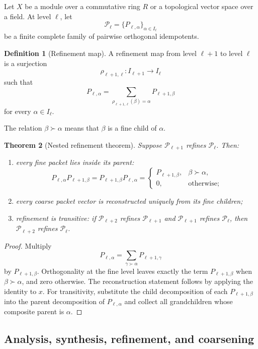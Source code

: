\documentclass[11pt]{article}
\newtheorem{theorem}{Theorem}[section]
\theoremstyle{definition}
\newtheorem{definition}[theorem]{Definition}
\theoremstyle{remark}
\newcommand{\cP}{\mathcal P}
\begin{document}
Let $X$ be a module over a commutative ring $R$ or a topological vector space over a field. At level $\ell$, let
\[
\cP_\ell=\{P_{\ell,\alpha}\}_{\alpha\in I_\ell}
\]
be a finite complete family of pairwise orthogonal idempotents.

\begin{definition}[Refinement map]\label{def:refinement-map}
A refinement map from level $\ell+1$ to level $\ell$ is a surjection
\[
\rho_{\ell+1,\ell}:I_{\ell+1}\longrightarrow I_\ell
\]
such that
\[
\boxed{
P_{\ell,\alpha}
=
\sum_{\rho_{\ell+1,\ell}(\beta)=\alpha}
P_{\ell+1,\beta}
}
\]
for every $\alpha\in I_\ell$.
\end{definition}

The relation $\beta\succ\alpha$ means that $\beta$ is a fine child of $\alpha$.

\begin{theorem}[Nested refinement theorem]\label{thm:nested-refinement}
Suppose $\cP_{\ell+1}$ refines $\cP_\ell$. Then:
\begin{enumerate}[label=(\alph*)]
\item every fine packet lies inside its parent:
\[
P_{\ell,\alpha}P_{\ell+1,\beta}
=
P_{\ell+1,\beta}P_{\ell,\alpha}
=
\begin{cases}
P_{\ell+1,\beta},&\beta\succ\alpha,\\
0,&\text{otherwise};
\end{cases}
\]
\item every coarse packet vector is reconstructed uniquely from its fine children;
\item refinement is transitive: if $\cP_{\ell+2}$ refines $\cP_{\ell+1}$ and $\cP_{\ell+1}$ refines $\cP_\ell$, then $\cP_{\ell+2}$ refines $\cP_\ell$.
\end{enumerate}
\end{theorem}

\begin{proof}
Multiply
\[
P_{\ell,\alpha}
=
\sum_{\gamma\succ\alpha}P_{\ell+1,\gamma}
\]
by $P_{\ell+1,\beta}$. Orthogonality at the fine level leaves exactly the term $P_{\ell+1,\beta}$ when $\beta\succ\alpha$, and zero otherwise. The reconstruction statement follows by applying the identity to $x$. For transitivity, substitute the child decomposition of each $P_{\ell+1,\beta}$ into the parent decomposition of $P_{\ell,\alpha}$ and collect all grandchildren whose composite parent is $\alpha$.
\end{proof}

\subsection{Analysis, synthesis, refinement, and coarsening}
\end{document}
